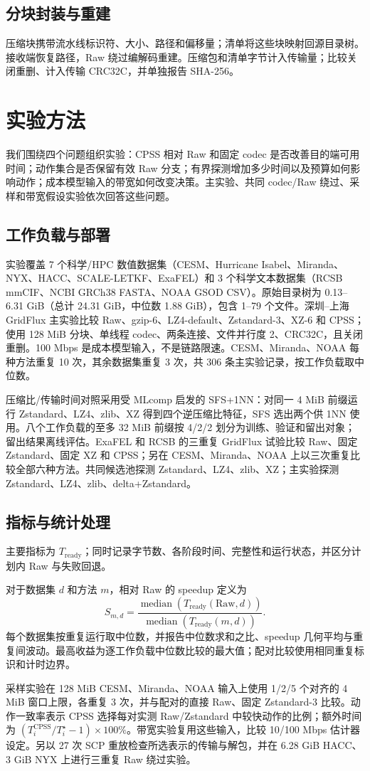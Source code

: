\documentclass[smallabstract,smallcaptions]{dccpaper}
\renewcommand{\Section}[1]{\vspace*{-0.05in}\section{#1}\vspace{0.025in}}
\renewcommand{\SubSection}[1]{\vspace*{-0.125in}\subsection{#1}}
\begin{document}
\SubSection{分块封装与重建}
压缩块携带流水线标识符、大小、路径和偏移量；清单将这些块映射回源目录树。接收端恢复路径，Raw 绕过编解码重建。压缩包和清单字节计入传输量；比较关闭重删、计入传输 CRC32C，并单独报告 SHA-256。

\Section{实验方法}

我们围绕四个问题组织实验：CPSS 相对 Raw 和固定 codec 是否改善目的端可用时间；动作集合是否保留有效 Raw 分支；有界探测增加多少时间以及预算如何影响动作；成本模型输入的带宽如何改变决策。主实验、共同 codec/Raw 绕过、采样和带宽假设实验依次回答这些问题。

\SubSection{工作负载与部署}
实验覆盖 7 个科学/HPC 数值数据集（CESM、Hurricane Isabel、Miranda、NYX、HACC、SCALE-LETKF、ExaFEL）和 3 个科学文本数据集（RCSB mmCIF、NCBI GRCh38 FASTA、NOAA GSOD CSV）。原始目录树为 0.13--6.31 GiB（总计 24.31 GiB，中位数 1.88 GiB），包含 1--79 个文件。深圳--上海 GridFlux 主实验比较 Raw、gzip-6、LZ4-default、Zstandard-3、XZ-6 和 CPSS；使用 128 MiB 分块、单线程 codec、两条连接、文件并行度 2、CRC32C，且关闭重删。100 Mbps 是成本模型输入，不是链路限速。CESM、Miranda、NOAA 每种方法重复 10 次，其余数据集重复 3 次，共 306 条主实验记录，按工作负载取中位数。

压缩比/传输时间对照采用受 MLcomp 启发的 SFS+1NN：对同一 4 MiB 前缀运行 Zstandard、LZ4、zlib、XZ 得到四个逆压缩比特征，SFS 选出两个供 1NN 使用。八个工作负载的至多 32 MiB 前缀按 4/2/2 划分为训练、验证和留出对象；留出结果离线评估。ExaFEL 和 RCSB 的三重复 GridFlux 试验比较 Raw、固定 Zstandard、固定 XZ 和 CPSS；另在 CESM、Miranda、NOAA 上以三次重复比较全部六种方法。共同候选池探测 Zstandard、LZ4、zlib、XZ；主实验探测 Zstandard、LZ4、zlib、delta+Zstandard。

\SubSection{指标与统计处理}
主要指标为 $T_{\mathrm{ready}}$；同时记录字节数、各阶段时间、完整性和运行状态，并区分计划内 Raw 与失败回退。

对于数据集 $d$ 和方法 $m$，相对 Raw 的 speedup 定义为
\begin{equation}
S_{m,d}=\frac{\operatorname{median}(T_{\mathrm{ready}}(\mathrm{Raw},d))}
{\operatorname{median}(T_{\mathrm{ready}}(m,d))}.
\end{equation}
每个数据集按重复运行取中位数，并报告中位数求和之比、speedup 几何平均与重复间波动。最高收益为逐工作负载中位数比较的最大值；配对比较使用相同重复标识和计时边界。

采样实验在 128 MiB CESM、Miranda、NOAA 输入上使用 1/2/5 个对齐的 4 MiB 窗口上限，各重复 3 次，并与配对的直接 Raw、固定 Zstandard-3 比较。动作一致率表示 CPSS 选择每对实测 Raw/Zstandard 中较快动作的比例；额外时间为 $(T_i^{\mathrm{CPSS}}/T_i^\star-1)\times100\%$。带宽实验复用这些输入，比较 10/100 Mbps 估计器设定。另以 27 次 SCP 重放检查所选表示的传输与解包，并在 6.28 GiB HACC、3 GiB NYX 上进行三重复 Raw 绕过实验。
\end{document}

